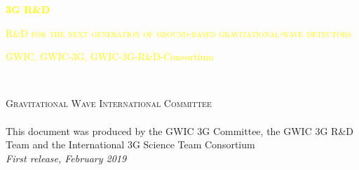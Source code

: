
\begingroup
\thispagestyle{empty}

\centering
\par\normalfont\fontsize{50}{50}\sffamily\selectfont
\textcolor{yellow}{\textbf{3G R\&D}}\\
\vskip6.5cm
\par\normalfont\fontsize{25}{25}\sffamily\selectfont
\textsc{\textcolor{yellow}{{R\&D for the next generation of ground-based gravitational-wave detectors}}}\par %
\vskip4cm
\textcolor{yellow}{\LARGE GWIC, GWIC-3G, GWIC-3G-R\&D-Consortium}\par %
\endgroup


\newpage
~\vfill
\thispagestyle{empty}


\noindent \textsc{Gravitational Wave International Committee}\\

\noindent \textsc{}\\ %

\noindent This document was produced by the GWIC 3G Committee, the GWIC 3G R\&D Team and the International 3G Science Team Consortium\\ %

\noindent \textit{First release, February 2019} %
\newpage


\pagestyle{empty} %
\tableofcontents %
\pagestyle{fancy} %
